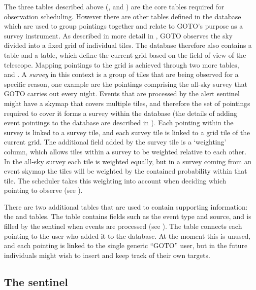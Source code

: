 \begin{colsection}
\begin{colsection}
The three tables described above (,  and ) are the core tables required for observation scheduling. However there are other tables defined in the database which are used to group pointings together and relate to GOTO's purpose as a survey instrument. As described in more detail in , GOTO observes the sky divided into a fixed grid of individual tiles. The database therefore also contains a  table and a  table, which define the current grid based on the field of view of the telescope. Mapping pointings to the grid is achieved through two more tables,  and . A \textit{survey} in this context is a group of tiles that are being observed for a specific reason, one example are the pointings comprising the all-sky survey that GOTO carries out every night. Events that are processed by the alert sentinel might have a skymap that covers multiple tiles, and therefore the set of pointings required to cover it forms a survey within the database (the details of adding event pointings to the database are described in ). Each pointing within the survey is linked to a survey tile, and each survey tile is linked to a grid tile of the current grid. The additional field added by the survey tile is a `weighting' column, which allows tiles within a survey to be weighted relative to each other. In the all-sky survey each tile is weighted equally, but in a survey coming from an event skymap the tiles will be weighted by the contained probability within that tile. The scheduler takes this weighting into account when deciding which pointing to observe (see ).

There are two additional tables that are used to contain supporting information: the  and  tables. The  table contains fields such as the event type and source, and is filled by the sentinel when events are processed (see ). The  table connects each pointing to the user who added it to the database. At the moment this is unused, and each pointing is linked to the single generic ``GOTO'' user, but in the future individuals might wish to insert and keep track of their own targets.

\end{colsection}


\subsection{The sentinel}
\label{sec:sentinel}
\begin{colsection}


\end{colsection}
\end{colsection}

